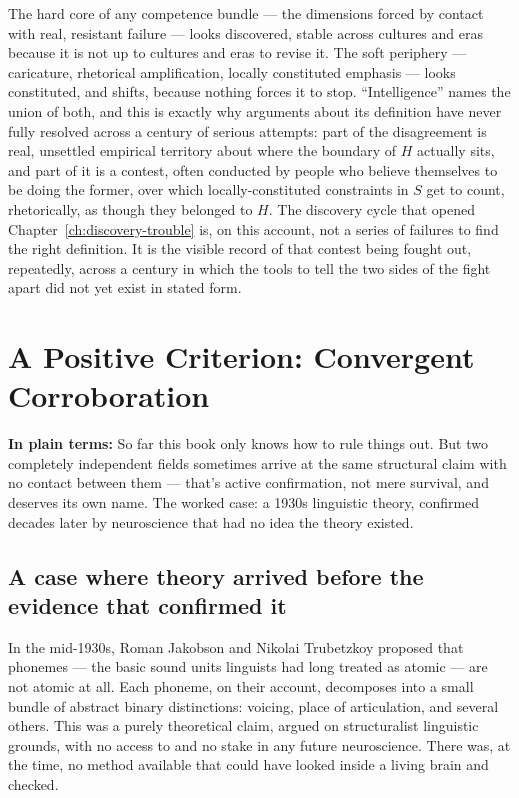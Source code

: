 The hard core of any competence bundle --- the dimensions forced by contact with real, resistant failure --- looks discovered, stable across cultures and eras because it is not up to cultures and eras to revise it. The soft periphery --- caricature, rhetorical amplification, locally constituted emphasis --- looks constituted, and shifts, because nothing forces it to stop. ``Intelligence'' names the union of both, and this is exactly why arguments about its definition have never fully resolved across a century of serious attempts: part of the disagreement is real, unsettled empirical territory about where the boundary of $H$ actually sits, and part of it is a contest, often conducted by people who believe themselves to be doing the former, over which locally-constituted constraints in $S$ get to count, rhetorically, as though they belonged to $H$. The discovery cycle that opened Chapter~\ref{ch:discovery-trouble} is, on this account, not a series of failures to find the right definition. It is the visible record of that contest being fought out, repeatedly, across a century in which the tools to tell the two sides of the fight apart did not yet exist in stated form.

\section{A Positive Criterion: Convergent Corroboration}
\label{sec:corroboration}

\begin{plainlanguage}
\textbf{In plain terms:} So far this book only knows how to rule things out. But two completely independent fields sometimes arrive at the same structural claim with no contact between them — that's active confirmation, not mere survival, and deserves its own name. The worked case: a 1930s linguistic theory, confirmed decades later by neuroscience that had no idea the theory existed.
\end{plainlanguage}

\subsection{A case where theory arrived before the evidence that confirmed it}

In the mid-1930s, Roman Jakobson and Nikolai Trubetzkoy proposed that phonemes --- the basic sound units linguists had long treated as atomic --- are not atomic at all. Each phoneme, on their account, decomposes into a small bundle of abstract binary distinctions: voicing, place of articulation, and several others. This was a purely theoretical claim, argued on structuralist linguistic grounds, with no access to and no stake in any future neuroscience. There was, at the time, no method available that could have looked inside a living brain and checked.

